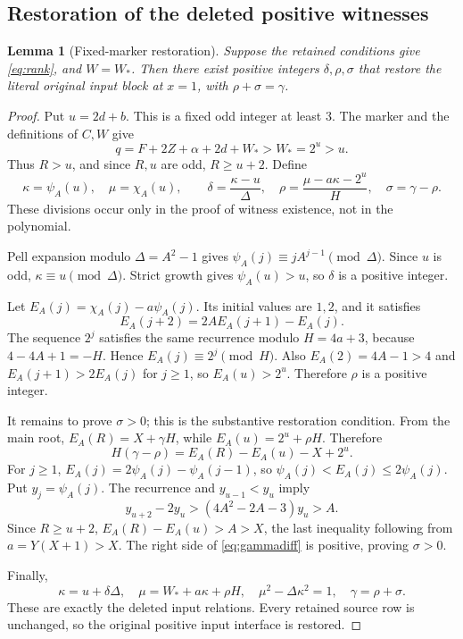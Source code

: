 \documentclass[11pt,a4paper]{article}
\newtheorem{lemma}[theorem]{Lemma}
\theoremstyle{remark}
\begin{document}
\subsection{Restoration of the deleted positive witnesses}

\begin{lemma}[Fixed-marker restoration]
\label{lem:restore}
Suppose the retained conditions give \eqref{eq:rank}, and $W=W_*$.
Then there exist positive integers $\delta,\rho,\sigma$ that restore
the literal original input block at $x=1$, with
$\rho+\sigma=\gamma$.
\end{lemma}

\begin{proof}
Put $u=2d+b$. This is a fixed odd integer at least $3$.
The marker and the definitions of $C,W$ give
\[
 q=F+2Z+\alpha+2d+W_*>W_*=2^u>u.
\]
Thus $R>u$, and since $R,u$ are odd, $R\ge u+2$. Define
\begin{equation}
 \kappa=\psi_A(u),\quad \mu=\chi_A(u),\qquad
 \delta=\frac{\kappa-u}{\Delta},\quad
 \rho=\frac{\mu-a\kappa-2^u}{H},\quad
 \sigma=\gamma-\rho.
\label{eq:restore}
\end{equation}
These divisions occur only in the proof of witness existence, not in
the polynomial.

Pell expansion modulo $\Delta=A^2-1$ gives
$\psi_A(j)\equiv jA^{j-1}\pmod\Delta$. Since $u$ is odd,
$\kappa\equiv u\pmod\Delta$. Strict growth gives
$\psi_A(u)>u$, so $\delta$ is a positive integer.

Let $E_A(j)=\chi_A(j)-a\psi_A(j)$. Its initial values are $1,2$,
and it satisfies
\[
 E_A(j+2)=2AE_A(j+1)-E_A(j).
\]
The sequence $2^j$ satisfies the same recurrence modulo $H=4a+3$,
because $4-4A+1=-H$. Hence $E_A(j)\equiv2^j\pmod H$.
Also $E_A(2)=4A-1>4$ and $E_A(j+1)>2E_A(j)$ for $j\ge1$,
so $E_A(u)>2^u$. Therefore $\rho$ is a positive integer.

It remains to prove $\sigma>0$; this is the substantive restoration
condition. From the main root,
$E_A(R)=X+\gamma H$, while $E_A(u)=2^u+\rho H$. Therefore
\begin{equation}
 H(\gamma-\rho)=E_A(R)-E_A(u)-X+2^u.
\label{eq:gammadiff}
\end{equation}
For $j\ge1$,
$E_A(j)=2\psi_A(j)-\psi_A(j-1)$, so
$\psi_A(j)<E_A(j)\le2\psi_A(j)$. Put $y_j=\psi_A(j)$.
The recurrence and $y_{u-1}<y_u$ imply
\[
 y_{u+2}-2y_u>(4A^2-2A-3)y_u>A.
\]
Since $R\ge u+2$,
$E_A(R)-E_A(u)>A>X$, the last inequality following from
$a=Y(X+1)>X$. The right side of \eqref{eq:gammadiff} is positive,
proving $\sigma>0$.

Finally,
\[
 \kappa=u+\delta\Delta,\quad
 \mu=W_*+a\kappa+\rho H,\quad
 \mu^2-\Delta\kappa^2=1,\quad \gamma=\rho+\sigma.
\]
These are exactly the deleted input relations. Every retained source
row is unchanged, so the original positive input interface is restored.
\end{proof}
\end{document}
